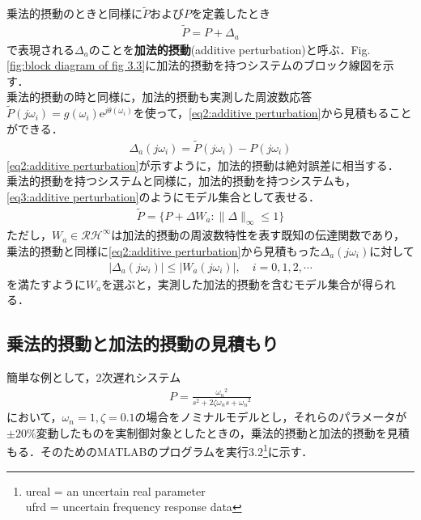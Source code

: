 \documentclass[a4paper,11pt,uplatex]{jsarticle} %
\theoremstyle{definition}	%
\newcommand{\figref}[1]{Fig. \ref{#1}}
\begin{document}
{乗法的摂動のときと同様に$\tilde{P}$および$P$を定義したとき
\begin{align}
\label{eq1: additive perturbation}
\tilde{P} = P + \Delta_a
\end{align}
で表現される$\Delta_a$のことを\textbf{加法的摂動}(additive perturbation)と呼ぶ．\figref{fig:block diagram of fig 3.3}に加法的摂動を持つシステムのブロック線図を示す．\\
乗法的摂動の時と同様に，加法的摂動も実測した周波数応答$\tilde{P}(j \omega_i) = g(\omega_i) \mathrm{e}^{j \theta(\omega_i)}$を使って，\eqref{eq2:additive perturbation}から見積もることができる．
\begin{align}
\label{eq2:additive perturbation}
\Delta_a (j \omega_i) = \tilde{P}(j \omega_i) - P(j \omega_i)
\end{align}
\eqref{eq2:additive perturbation}が示すように，加法的摂動は絶対誤差に相当する．\\
乗法的摂動を持つシステムと同様に，加法的摂動を持つシステムも，\eqref{eq3:additive perturbation}のようにモデル集合として表せる．
\begin{align}
\label{eq3:additive perturbation}
\tilde{P} = \{ P + \Delta W_a: \| \Delta \|_\infty \leq 1 \}
\end{align}
ただし，$W_a \in \mathcal{RH}^\infty$は加法的摂動の周波数特性を表す既知の伝達関数であり，乗法的摂動と同様に\eqref{eq2:additive perturbation}から見積もった$\Delta_a (j\omega_i)$に対して
\begin{align}
\label{eq4:additive perturbation}
| \Delta_a (j\omega_i) | \leq | W_a (j\omega_i) |, \quad i = 0,1,2,\cdots
\end{align}
を満たすように$W_a$を選ぶと，実測した加法的摂動を含むモデル集合が得られる．

\subsection{乗法的摂動と加法的摂動の見積もり}
簡単な例として，2次遅れシステム
\begin{align}
\label{tf:action 3.2}
P = \frac{{\omega_n}^2}{s^2 + 2 \zeta \omega_n s + {\omega_n}^2}
\end{align}
において，$\omega_n = 1, \zeta = 0.1$の場合をノミナルモデルとし，それらのパラメータが$\pm 20\%$変動したものを実制御対象としたときの，乗法的摂動と加法的摂動を見積もる．そのためのMATLABのプログラムを実行3.2\footnote{ureal = an uncertain real parameter \\ ufrd = uncertain frequency response data}に示す．

}
\end{document}
